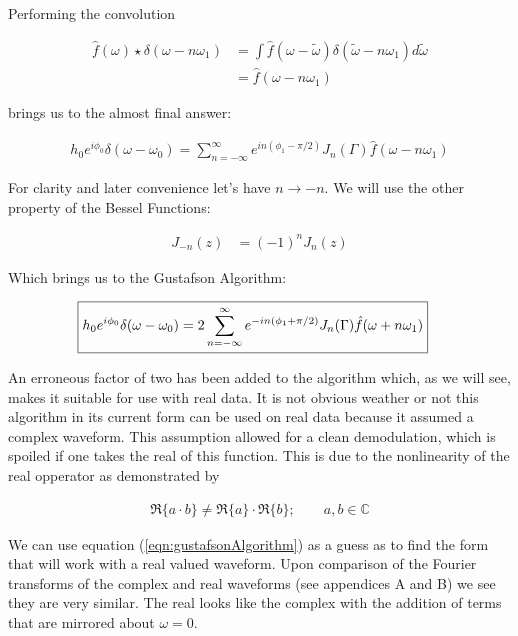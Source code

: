 \documentclass[onecolumn, groupedaddress, 10pt]{revtex4-1}
\begin{document}
Performing the convolution 

\begin{align}
\hat{f}(\omega) \star \delta (\omega - n\omega_1) 
&= \int \hat{f}(\omega - \widetilde{\omega}) \delta(\widetilde{\omega} - n\omega_1) d\widetilde{\omega}			\\
&= \hat{f} (\omega - n\omega_1)
\end{align}

brings us to the almost final answer:

\begin{align}
h_0 e^{i\phi_0} \delta (\omega - \omega_0) = \sum_{n=-\infty}^{\infty} e^{in(\phi_1-\pi/2)} J_n(\Gamma) \hat{f} (\omega - n\omega_1)
\end{align}

For clarity and later convenience let's have $n\to -n$.  We will use the other property of the Bessel Functions: \cite{}

\begin{align}
J_{-n} (z) &= (-1)^n J_n(z)
\end{align}

Which brings us to the Gustafson Algorithm:

\begin{align}
\label{eqn:gustafsonAlgorithm}
\Aboxed{h_0 e^{i\phi_0} \delta (\omega - \omega_0) = 2 \sum_{n=-\infty}^{\infty} e^{-in(\phi_1+\pi/2)} J_n(\Gamma) \hat{f} (\omega + n\omega_1)}
\end{align}


An erroneous factor of two has been added to the algorithm which, as we will see, makes it suitable for use with real data.  It is not obvious weather or not this algorithm in its current form can be used on real data because it assumed a complex waveform.  This assumption allowed for a clean demodulation, which is spoiled if one takes the real of this function.  This is due to the nonlinearity of the real opperator as demonstrated by

\begin{align}
\Re \{ a \cdot b \} \neq \Re \{ a \} \cdot \Re \{ b \}; \qquad a,b \in \mathds{C}
\end{align}

We can use equation (\ref{eqn:gustafsonAlgorithm}) as a guess as to find the form that will work with a real valued waveform.  Upon comparison of the Fourier transforms of the complex and real waveforms (see appendices A and B) we see they are very similar.  The real looks like the complex with the addition of terms that are mirrored about $\omega=0$.
\end{document}

